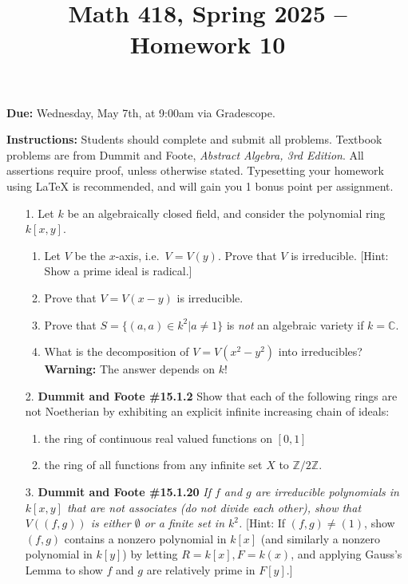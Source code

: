 \documentclass[12pt]{article}
\title{Math 418, Spring 2025 -- Homework 10}
\date{}
\newcommand{\Z}{\mathbb{Z}}
\newcommand{\C}{\mathbb{C}}
\begin{document}
 \maketitle
\vspace{-80pt}

\textbf{Due:} Wednesday, May 7th, at 9:00am via Gradescope.

\textbf{Instructions:} Students should complete and submit all problems. Textbook problems are from Dummit and Foote, \emph{Abstract Algebra, 3rd Edition}. All assertions require proof, unless otherwise stated. Typesetting your homework using LaTeX is recommended, and will gain you 1 bonus point per assignment.

\begin{enumerate}

\item[1.] Let $k$ be an algebraically closed field, and consider the polynomial ring $k[x,y]$.  
  \begin{enumerate}
  \item Let $V$ be the $x$-axis, i.e.~$V = V(y)$. Prove that $V$ is irreducible. [Hint: Show a prime ideal is radical.]
  
  \item Prove that $V = V(x - y)$ is irreducible. 
  
  \item Prove that $S = \{(a,a) \in k^2 |a \neq 1\}$ is \emph{not} an algebraic variety if $k = \C$.

  \item What is the decomposition of $V = V(x^2 - y^2)$ into irreducibles?  \textbf{Warning:} The answer depends on $k$!
  \end{enumerate}

\item[2.] \textbf{Dummit and Foote \#15.1.2} Show that each of the following rings are not Noetherian by exhibiting an explicit infinite increasing chain of ideals:

\begin{enumerate}
\item the ring of continuous real valued functions on $[0, 1]$

\item the ring of all functions from any infinite set $X$ to $\Z/2\Z$.

\end{enumerate}

\item[3.] \textbf{Dummit and Foote \#15.1.20} \textit{If $f$ and $g$ are irreducible polynomials in $k[x, y]$ that are not associates (do not divide each other), show that $V((f, g))$ is either $\emptyset$ or a finite set in $k^2$.} [Hint: If $(f, g) \ne (1)$, show $(f, g)$ contains a nonzero polynomial in $k[x]$ (and similarly a nonzero polynomial in $k[y]$) by letting $R = k[x], F = k(x)$, and applying Gauss's Lemma to show $f$ and $g$ are relatively prime in $F[y]$.]


\end{enumerate}
\end{document}
